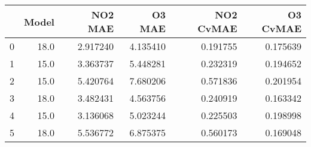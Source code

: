 \begin{tabular}{lrrrrr}
\toprule
{} &  Model &   NO2 MAE &    O3 MAE &  NO2 CvMAE &  O3 CvMAE \\
\midrule
0 &   18.0 &  2.917240 &  4.135410 &   0.191755 &  0.175639 \\
1 &   15.0 &  3.363737 &  5.448281 &   0.232319 &  0.194652 \\
2 &   15.0 &  5.420764 &  7.680206 &   0.571836 &  0.201954 \\
3 &   18.0 &  3.482431 &  4.563756 &   0.240919 &  0.163342 \\
4 &   15.0 &  3.136068 &  5.023244 &   0.225503 &  0.198998 \\
5 &   18.0 &  5.536772 &  6.875375 &   0.560173 &  0.169048 \\
\bottomrule
\end{tabular}
